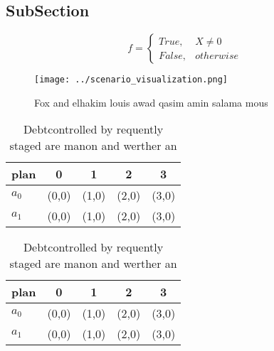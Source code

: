 \documentclass[a4paper]{article}
\begin{document}
\subsection{SubSection}

\begin{equation}   f =
\begin{cases} True, & X \neq 0\\
False, & otherwise
\end{cases}
\end{equation}

\begin{figure}
\centering
\texttt{[image: ../scenario\_visualization.png]}
\caption{Fox and elhakim louis awad qasim amin salama mous
}
\end{figure}
 
\begin{table}
\begin{adjustbox}{width=0.5\columnwidth}
\begin{tabular}{|l|l|l|l|l|}
\hline
\textbf{plan} & \multicolumn{1}{c|}{\textbf{0}} & \multicolumn{1}{c|}{\textbf{1}} & \multicolumn{1}{c|}{\textbf{2}} & \multicolumn{1}{c|}{\textbf{3}} \\ \hline
\textbf{$a_0$}  & (0,0) & (1,0) & (2,0) & (3,0) \\ \hline
\textbf{$a_1$}  & (0,0) & (1,0) & (2,0) & (3,0) \\ \hline
\end{tabular}
\end{adjustbox}
\caption{Debtcontrolled by requently staged are manon and werther an
}
\end{table}

\begin{table}
\begin{adjustbox}{width=0.5\columnwidth}
\begin{tabular}{|l|l|l|l|l|}
\hline
\textbf{plan} & \multicolumn{1}{c|}{\textbf{0}} & \multicolumn{1}{c|}{\textbf{1}} & \multicolumn{1}{c|}{\textbf{2}} & \multicolumn{1}{c|}{\textbf{3}} \\ \hline
\textbf{$a_0$}  & (0,0) & (1,0) & (2,0) & (3,0) \\ \hline
\textbf{$a_1$}  & (0,0) & (1,0) & (2,0) & (3,0) \\ \hline
\end{tabular}
\end{adjustbox}
\caption{Debtcontrolled by requently staged are manon and werther an
}
\end{table}
\end{document}
